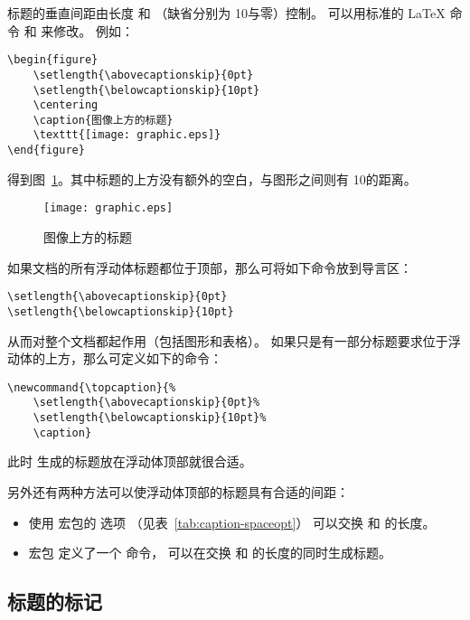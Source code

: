 标题的垂直间距由长度  和 
（缺省分别为 10\pt 与零）控制。
可以用标准的 \LaTeX{} 命令  和  来修改。
例如：
\begin{lstlisting}
\begin{figure} 
	\setlength{\abovecaptionskip}{0pt} 
	\setlength{\belowcaptionskip}{10pt} 
	\centering 
	\caption{图像上方的标题} 
	\texttt{[image: graphic.eps]} 
\end{figure}
\end{lstlisting}
得到图~\ref{fig:normalabovefig}。其中标题的上方没有额外的空白，与图形之间则有 10\pt 的距离。

\begin{figure}[hb]
    \captionsetup{position=below}
	\setlength{\abovecaptionskip}{0pt} 
	\setlength{\belowcaptionskip}{10pt} 
	\centering 
	\caption{图像上方的标题}\label{fig:normalabovefig}
	\texttt{[image: graphic.eps]} 
\end{figure}

如果文档的所有浮动体标题都位于顶部，那么可将如下命令放到导言区：
\begin{lstlisting}
\setlength{\abovecaptionskip}{0pt}
\setlength{\belowcaptionskip}{10pt}
\end{lstlisting}
从而对整个文档都起作用（包括图形和表格）。
如果只是有一部分标题要求位于浮动体的上方，那么可定义如下的命令：
\begin{lstlisting}
\newcommand{\topcaption}{% 
	\setlength{\abovecaptionskip}{0pt}% 
	\setlength{\belowcaptionskip}{10pt}% 
	\caption}
\end{lstlisting}
此时  生成的标题放在浮动体顶部就很合适。

另外还有两种方法可以使浮动体顶部的标题具有合适的间距：
\begin{itemize}
	\item 使用  宏包的  选项
	（见表~\ref{tab:caption-spaceopt}）
	可以交换  和  的长度。
	
	\item {} 宏包 \cite{topcapt-doc} 定义了一个  命令，
	可以在交换   和  的长度的同时生成标题。
\end{itemize}

\subsection{标题的标记}\label{ssec:captionlabel}

